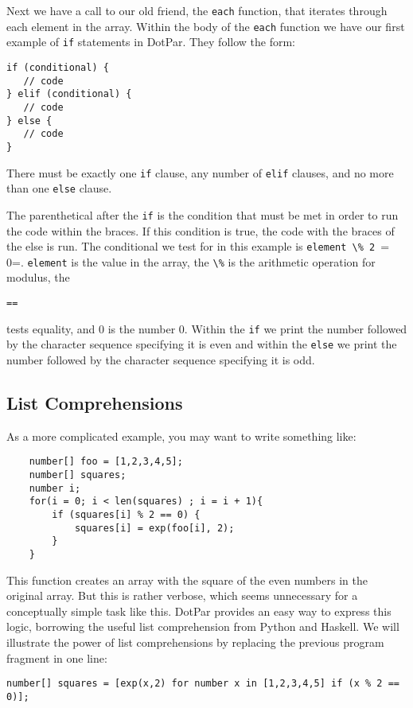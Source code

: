 Next we have a call to our old friend, the \verb=each= function, that iterates through each element in the array. Within the body of the \verb=each= function we have our first example of \verb=if= statements in DotPar. They follow the form: 

\begin{verbatim}
if (conditional) {
   // code
} elif (conditional) {
   // code
} else {
   // code
}
\end{verbatim}

There must be exactly one \verb=if= clause, any number of \verb=elif= clauses, and no more than one \verb=else= clause.

The parenthetical after the \verb=if= is the condition that must be met in order to run the code within the braces. If this condition is true, the code with the braces of the else is run. The conditional we test for in this example is \verb=element \% 2 == 0=. \verb=element= is the value in the array, the \verb=\%= is the arithmetic operation for modulus, the \begin{verbatim}== 
\end{verbatim} tests equality, and 0 is the number 0. Within the \verb=if= we print the number followed by the character sequence specifying it is even and within the \verb=else= we print the number followed by the character sequence specifying it is odd.

\subsection{List Comprehensions}
As a more complicated example, you may want to write something like:

\begin{verbatim}
    number[] foo = [1,2,3,4,5];
    number[] squares;
    number i;
    for(i = 0; i < len(squares) ; i = i + 1){
        if (squares[i] % 2 == 0) {
            squares[i] = exp(foo[i], 2);
        }
    }
\end{verbatim}

This function creates an array with the square of the even numbers in the original array. But this is rather verbose, which seems unnecessary for a conceptually simple task like this. DotPar provides an easy way to express this logic, borrowing the useful list comprehension from Python and Haskell. We will illustrate the power of list comprehensions by replacing the previous program fragment in one line:

\begin{verbatim}
number[] squares = [exp(x,2) for number x in [1,2,3,4,5] if (x % 2 == 0)];
\end{verbatim}

